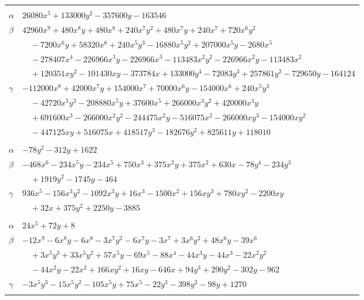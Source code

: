 \documentclass[11pt]{article}
\begin{document}
\begin{longtable}{@{}ll@{}}
\addlinespace[3pt]
\multicolumn{2}{@{}l}{$\{i,j\}=\{17,23\}$, $k_{ij}=2\cdot 17^{2}$}\\
$\alpha$ & $26080x^{5}+133000y^{2}-357600y-163546$\\
$\beta$ & $42960x^{9}+480x^{8}y+480x^{8}+240x^{7}y^{2}+480x^{7}y+240x^{7}+720x^{6}y^{2}$\\
 & $\quad -7200x^{6}y+58320x^{6}+240x^{5}y^{3}-16880x^{5}y^{2}+207000x^{5}y-2680x^{5}$\\
 & $\quad -278407x^{4}-226966x^{3}y-226966x^{3}-113483x^{2}y^{2}-226966x^{2}y-113483x^{2}$\\
 & $\quad +120351xy^{2}-101430xy-373784x+133000y^{4}-72083y^{3}+257861y^{2}-729650y-164124$\\
$\gamma$ & $-112000x^{8}+42000x^{7}y+154000x^{7}+70000x^{6}y-154000x^{6}+240x^{5}y^{3}$\\
 & $\quad -42720x^{5}y^{2}-208880x^{5}y+37600x^{5}+266000x^{3}y^{2}+420000x^{3}y$\\
 & $\quad +691600x^{3}-266000x^{2}y^{2}-244475x^{2}y-516075x^{2}-266000xy^{3}-154000xy^{2}$\\
 & $\quad -447125xy+516075x+418517y^{3}-182676y^{2}+825611y+118010$\\
\addlinespace[3pt]
\multicolumn{2}{@{}l}{$\{i,j\}=\{17,31\}$, $k_{ij}=2^{7}\cdot 7\cdot 11$}\\
$\alpha$ & $-78y^{2}-312y+1622$\\
$\beta$ & $-468x^{6}-234x^{5}y-234x^{5}+750x^{3}+375x^{2}y+375x^{2}+630x-78y^{4}-234y^{3}$\\
 & $\quad +1919y^{2}-1745y-464$\\
$\gamma$ & $936x^{5}-156x^{3}y^{2}-1092x^{3}y+16x^{3}-1500x^{2}+156xy^{3}+780xy^{2}-2200xy$\\
 & $\quad +32x+375y^{2}+2250y-3885$\\
\addlinespace[3pt]
\multicolumn{2}{@{}l}{$\{i,j\}=\{17,39\}$, $k_{ij}=2^{6}\cdot 5\cdot 7$}\\
$\alpha$ & $24x^{5}+72y+8$\\
$\beta$ & $-12x^{9}-6x^{8}y-6x^{8}-3x^{7}y^{2}-6x^{7}y-3x^{7}+3x^{6}y^{2}+48x^{6}y-39x^{6}$\\
 & $\quad +3x^{5}y^{3}+33x^{5}y^{2}+57x^{5}y-69x^{5}-88x^{4}-44x^{3}y-44x^{3}-22x^{2}y^{2}$\\
 & $\quad -44x^{2}y-22x^{2}+166xy^{2}+16xy-646x+94y^{3}+290y^{2}-302y-962$\\
$\gamma$ & $-3x^{5}y^{3}-15x^{5}y^{2}-105x^{5}y+75x^{5}-22y^{3}-398y^{2}-98y+1270$\\
\addlinespace[3pt]

\end{longtable}
\end{document}
